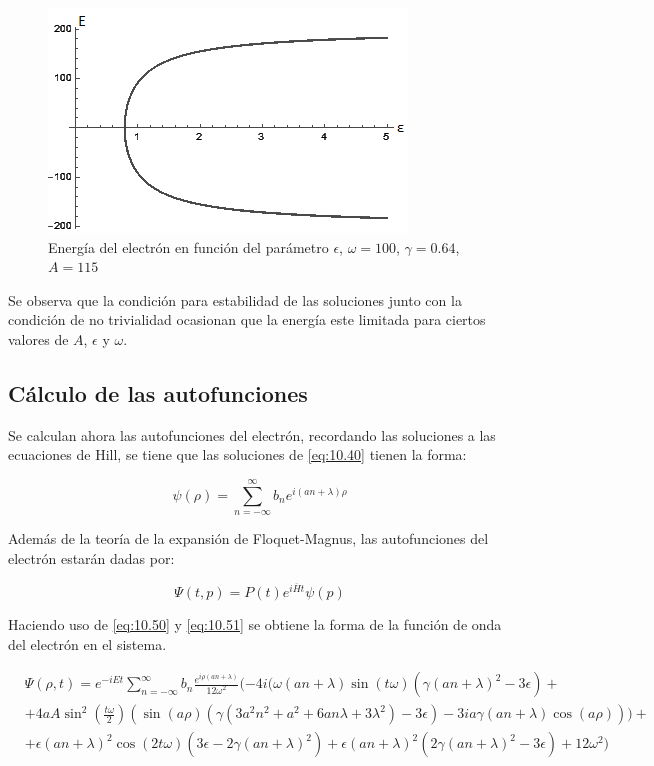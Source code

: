 \begin{figure}[H]
    \centering
    \includegraphics[scale=1]{imagenes/ener-e.png}
    \caption{Energía del electrón en función del parámetro $\epsilon$, $\omega=100$, $\gamma=0.64$, $A=115$}
    \label{fig:10.4}
\end{figure}

Se observa que la condición para estabilidad de las soluciones junto con la condición de no trivialidad ocasionan que la energía este limitada para ciertos valores de $A$, $\epsilon$ y $\omega$.

\subsection{Cálculo de las autofunciones}

Se calculan ahora las autofunciones del electrón, recordando las soluciones a las ecuaciones de Hill, se tiene que las soluciones de \ref{eq:10.40} tienen la forma:

\begin{equation}\label{eq:10.50}
    \psi(\rho)=\sum^{\infty}_{n=-\infty} b_n e^{i(an+\lambda)\rho}
\end{equation}

Además de la teoría de la expansión de Floquet-Magnus, las autofunciones del electrón estarán dadas por:

\begin{equation}\label{eq:10.51}
    \Psi(t,p)=P(t)e^{i\overline{H}t}\psi(p)
\end{equation}

Haciendo uso de \ref{eq:10.50} y \ref{eq:10.51} se obtiene la forma de la función de onda del electrón en el sistema.

\small
\begin{equation}\label{eq:10.52}
    \begin{split}
    &\Psi(\rho,t)=e^{-iEt}\sum^{\infty}_{n=-\infty}b_n\frac{e^{i \rho (a n+\lambda)}}{12 \omega^2} (-4 i (\omega (a n+\lambda) \sin (t \omega) \left(\gamma (a n+\lambda)^2-3 \epsilon\right)+\\&+4 a A \sin
   ^2\left(\frac{t \omega}{2}\right) \left(\sin (a \rho) \left(\gamma \left(3 a^2 n^2+a^2+6 a n \lambda+3 \lambda^2\right)-3 \epsilon\right)-3 i
   a \gamma (a n+\lambda) \cos (a \rho)\right))+\\&+\epsilon (a n+\lambda)^2 \cos (2 t \omega) \left(3 \epsilon-2 \gamma (a
   n+\lambda)^2\right)+\epsilon (a n+\lambda)^2 \left(2 \gamma (a n+\lambda)^2-3 \epsilon\right)+12 \omega^2)
   \end{split}
\end{equation}

